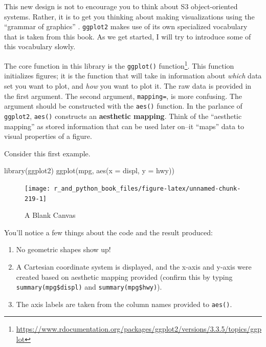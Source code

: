 \documentclass[
  12pt,
  krantz2]{krantz}
\makeatletter
\newenvironment{Shaded}{\begin{snugshade}}{\end{snugshade}}
\newcommand{\AttributeTok}[1]{\textcolor[rgb]{0.61,0.61,0.61}{#1}}
\newcommand{\FunctionTok}[1]{\textcolor[rgb]{0,0,0}{#1}}
\newcommand{\NormalTok}[1]{#1}
\renewcommand{\href}[2]{#2\footnote{\url{#1}}}
\newenvironment{kframe}{%
\medskip{}
\setlength{\fboxsep}{.8em}
 \def\at@end@of@kframe{}%
 \ifinner\ifhmode%
  \def\at@end@of@kframe{\end{minipage}}%
  \begin{minipage}{\columnwidth}%
 \fi\fi%
 \def\FrameCommand##1{\hskip\@totalleftmargin \hskip-\fboxsep
 \colorbox{shadecolor}{##1}\hskip-\fboxsep
     \hskip-\linewidth \hskip-\@totalleftmargin \hskip\columnwidth}%
 \MakeFramed {\advance\hsize-\width
   \@totalleftmargin\z@ \linewidth\hsize
   \@setminipage}}%
 {\par\unskip\endMakeFramed%
 \at@end@of@kframe}
\renewenvironment{Shaded}{\begin{kframe}}{\end{kframe}}
\makeatother
\begin{document}
This new design is not to encourage you to think about S3 object-oriented systems. Rather, it is to get you thinking about making visualizations using the ``grammar of graphics'' \citep{gog}. \texttt{ggplot2} makes use of its own specialized vocabulary that is taken from this book. As we get started, I will try to introduce some of this vocabulary slowly.

The core function in this library is the \href{https://www.rdocumentation.org/packages/ggplot2/versions/3.3.5/topics/ggplot}{\texttt{ggplot()} function}. This function initializes figures; it is the function that will take in information about \emph{which} data set you want to plot, and \emph{how} you want to plot it. The raw data is provided in the first argument. The second argument, \texttt{mapping=}, is more confusing. The argument should be constructed with the \texttt{aes()} function. In the parlance of \texttt{ggplot2}, \texttt{aes()} constructs an \textbf{aesthetic mapping}. Think of the ``aesthetic mapping'' as stored information that can be used later on--it ``maps'' data to visual properties of a figure.

Consider this first example.

\begin{Shaded}
\begin{Highlighting}[]
\FunctionTok{library}\NormalTok{(ggplot2)}
\FunctionTok{ggplot}\NormalTok{(mpg, }\FunctionTok{aes}\NormalTok{(}\AttributeTok{x =}\NormalTok{ displ, }\AttributeTok{y =}\NormalTok{ hwy))}
\end{Highlighting}
\end{Shaded}

\begin{figure}
\texttt{[image: r\_and\_python\_book\_files/figure-latex/unnamed-chunk-219-1]} \caption{A Blank Canvas}\label{fig:unnamed-chunk-219}
\end{figure}

You'll notice a few things about the code and the result produced:

\begin{enumerate}
\def\labelenumi{\arabic{enumi}.}
\item
  No geometric shapes show up!
\item
  A Cartesian coordinate system is displayed, and the x-axis and y-axis were created based on aesthetic mapping provided (confirm this by typing \texttt{summary(mpg\$displ)} and \texttt{summary(mpg\$hwy)}).
\item
  The axis labels are taken from the column names provided to \texttt{aes()}.
\end{enumerate}
\end{document}
